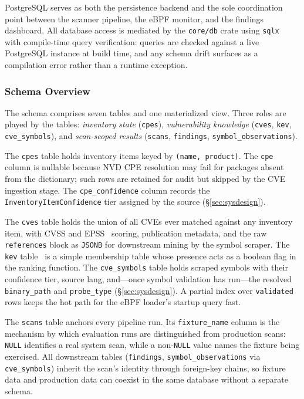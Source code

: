\documentclass[conference]{IEEEtran}
\begin{document}
PostgreSQL serves as both the persistence backend and the sole coordination point between the scanner pipeline, the eBPF monitor, and the findings dashboard. All database access is mediated by the \texttt{core/db} crate using \texttt{sqlx}~\cite{sqlx} with compile-time query verification: queries are checked against a live PostgreSQL instance at build time, and any schema drift surfaces as a compilation error rather than a runtime exception.

\subsubsection{Schema Overview}

The schema comprises seven tables and one materialized view. Three roles are played by the tables: \emph{inventory state} (\texttt{cpes}), \emph{vulnerability knowledge} (\texttt{cves}, \texttt{kev}, \texttt{cve\_symbols}), and \emph{scan-scoped results} (\texttt{scans}, \texttt{findings}, \texttt{symbol\_observations}).

The \texttt{cpes} table holds inventory items keyed by \texttt{(name, product)}. The \texttt{cpe} column is nullable because NVD CPE resolution may fail for packages absent from the dictionary; such rows are retained for audit but skipped by the CVE ingestion stage. The \texttt{cpe\_confidence} column records the \texttt{InventoryItemConfidence} tier assigned by the source (\S\ref{sec:sysdesign}).

The \texttt{cves} table holds the union of all CVEs ever matched against any inventory item, with CVSS and EPSS~\cite{epss} scoring, publication metadata, and the raw \texttt{references} block as \texttt{JSONB} for downstream mining by the symbol scraper. The \texttt{kev} table~\cite{cisa_kev} is a simple membership table whose presence acts as a boolean flag in the ranking function. The \texttt{cve\_symbols} table holds scraped symbols with their confidence tier, source lang, and---once symbol validation has run---the resolved \texttt{binary\_path} and \texttt{probe\_type} (\S\ref{sec:sysdesign}). A partial index over \texttt{validated} rows keeps the hot path for the eBPF loader's startup query fast.

The \texttt{scans} table anchors every pipeline run. Its \texttt{fixture\_name} column is the mechanism by which evaluation runs are distinguished from production scans: \texttt{NULL} identifies a real system scan, while a non-\texttt{NULL} value names the fixture being exercised. All downstream tables (\texttt{findings}, \texttt{symbol\_observations} via \texttt{cve\_symbols}) inherit the scan's identity through foreign-key chains, so fixture data and production data can coexist in the same database without a separate schema.
\end{document}
